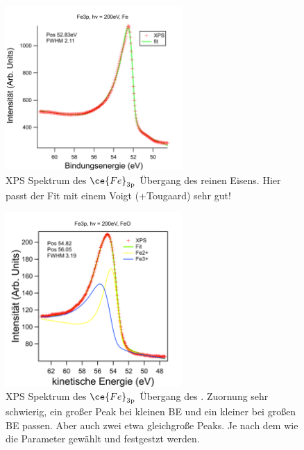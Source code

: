             \begin{figure}
                \centering
                \includegraphics[width=0.6\textwidth]{./content/pictures/Fe/Fe3p_Fe.png}
                \caption{XPS Spektrum des $\ce{Fe}_{3\text{p}}$ Übergang des reinen Eisens. Hier passt der Fit mit einem Voigt (+Tougaard) sehr gut!}
                \label{fig:XPSFe3p_Fe}
            \end{figure}
            \begin{figure}
                \centering
                \includegraphics[width=0.6\textwidth]{./content/pictures/FeO/Fe3p_FeO.png}
                \caption{XPS Spektrum des $\ce{Fe}_{3\text{p}}$ Übergang des . Zuornung sehr schwierig, ein großer Peak bei kleinen BE und ein kleiner bei großen BE passen. Aber auch zwei etwa gleichgroße Peaks. Je nach dem wie die Parameter gewählt und festgestzt werden.}
                \label{fig:XPSFe3p_FeO}
            \end{figure}
